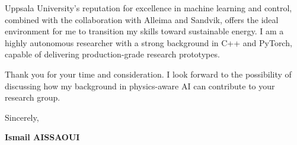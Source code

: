 \documentclass[a4paper,12pt]{article}
\begin{document}
Uppsala University’s reputation for excellence in machine learning and control, combined with the collaboration with Alleima and Sandvik, offers the ideal environment for me to transition my skills toward sustainable energy. I am a highly autonomous researcher with a strong background in C++ and PyTorch, capable of delivering production-grade research prototypes.

Thank you for your time and consideration. I look forward to the possibility of discussing how my background in physics-aware AI can contribute to your research group.

Sincerely,

\bigskip

\textbf{Ismail AISSAOUI}
\end{document}
